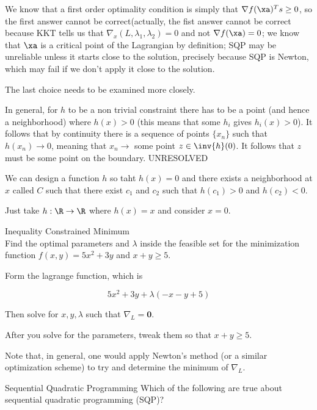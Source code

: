 \documentclass[../main.tex]{subfiles}
\begin{document}
\begin{solution}

    We know that a first order optimality condition is simply that $\nabla f(\xa)^T s \geq 0$, so the first answer cannot be correct(actually, the fist answer cannot be correct because KKT tells us that $\nabla_x(L, \lambda_1, \lambda_2) =  0$ and not $\nabla f(\xa) = 0$; we know that $\xa$ is a critical point of the Lagrangian by definition; SQP may be unreliable unless it starts close to the solution, precisely because SQP is Newton, which may fail if we don't apply it close to the solution.

    The last choice needs to be examined more closely.

    In general, for $h$ to be a non trivial constraint there has to be a point (and hence a neighborhood) where $h(x) > 0$ (this means that some $h_i$ gives $h_i(x) > 0$). It follows that by continuity there is a sequence of points $\{x_n\}$ such that $h(x_n) \to 0$, meaning that $x_n \to $ some point $z \in \inv{h}(0)$. It follows that $z$ must be some point on the boundary. UNRESOLVED

    We can design a function $h$ so taht $h(x) = 0$ and there exists a neighborhood at $x$ called $C$ such that there exist $c_1$ and $c_2$ such that $h(c_1) > 0$ and $h(c_2) < 0$.
    
    Just take $h: \R \to \R$ where $h(x) = x$ and consider $x = 0$.
\end{solution}


Inequality Constrained Minimum \\
Find the optimal parameters and $\lambda$ inside the feasible set for the minimization function $f(x,y) = 5x^2 + 3y$ and $x+y \geq 5$.
\begin{solution}
    Form the lagrange function, which is

    \[
        5x^2 + 3y + \lambda(-x  -y +5)
    \]

    Then solve for $x,y, \lambda$ such that $\nabla_{L} = \mathbf{0}$.

    After you solve for the parameters, tweak them so that $x + y \geq 5$.

    Note that, in general, one would apply Newton's method (or a similar
    optimization scheme) to try and determine the minimum of $\nabla_{L}$.
\end{solution}

Sequential Quadratic Programming
Which of the following are true about sequential quadratic programming (SQP)?
\end{document}
